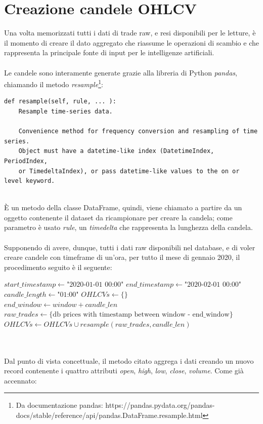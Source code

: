 \documentclass[a4paper,12pt]{report}
\begin{document}
\section{Creazione candele OHLCV}
Una volta memorizzati tutti i dati di trade raw, e resi disponibili per le letture, è il momento di creare il dato aggregato che riassume le operazioni di scambio e che rappresenta la principale fonte di input per le intelligenze artificiali.\\~\\
Le candele sono interamente generate grazie alla libreria di Python \textit{pandas}, chiamando il metodo \textit{resample}\footnote{Da documentazione pandas: https://pandas.pydata.org/pandas-docs/stable/reference/api/pandas.DataFrame.resample.html}:
\begin{verbatim}
def resample(self, rule, ... ):
	Resample time-series data.
	
	Convenience method for frequency conversion and resampling of time series.
	Object must have a datetime-like index (DatetimeIndex, PeriodIndex, 
	or TimedeltaIndex), or pass datetime-like values to the on or level keyword.
	
\end{verbatim}
È un metodo della classe DataFrame, quindi, viene chiamato a partire da un oggetto contenente il dataset da ricampionare per creare la candela; come parametro è usato \textit{rule}, un \textit{timedelta} che rappresenta la lunghezza della candela.
\\~\\
Supponendo di avere, dunque, tutti i dati raw disponibili nel database, e di voler creare candele con timeframe di un'ora, per tutto il mese di gennaio 2020, il procedimento seguito è il seguente:\\

\begin{algorithmic}
	\State $start\_timestamp\gets \text{"2020-01-01 00:00"}$
	\State $end\_timestamp\gets \text{"2020-02-01 00:00"}$
	\State $candle\_length\gets \text{"01:00"}$
	\State $OHLCVs\gets \{\}$
	\\
	\State $end\_window\gets window+candle\_len$
	\State $raw\_trades\gets \{ \text{db prices with timestamp between window - end\_window}\}$
	\State $OHLCVs\gets OHLCVs \cup resample(raw\_trades, candle\_len)$
	\EndFor
	\\
\end{algorithmic}
\\~\\
Dal punto di vista concettuale, il metodo citato aggrega i dati creando un nuovo record contenente i quattro attributi \textit{open}, \textit{high}, \textit{low}, \textit{close}, \textit{volume}. Come già accennato:
\end{document}
